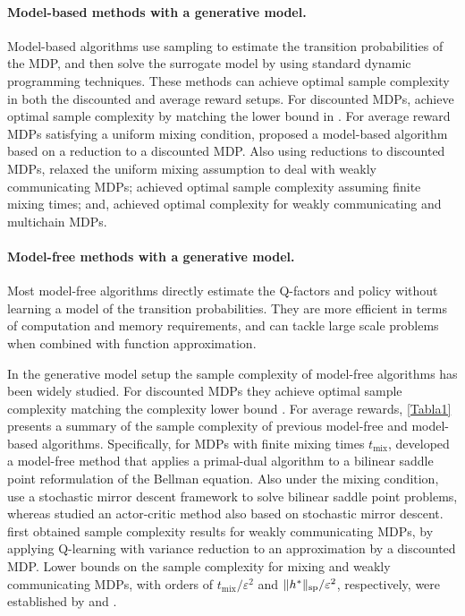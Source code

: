 \documentclass{article}
\renewcommand{\sp}[1]{\|{#1}\|_\text{\rm sp}}
\theoremstyle{plain}
\theoremstyle{definition}
\theoremstyle{remark}
\begin{document}
\paragraph{Model-based methods with a generative model.}
Model-based algorithms use sampling to estimate the transition probabilities of the MDP, and then solve the surrogate model by using standard dynamic programming techniques. These methods can achieve optimal sample complexity in both the discounted and average reward setups. For discounted MDPs, \citet{agarwal2020model, li2020breaking} achieve optimal sample complexity by matching the lower bound in \citet{gheshlaghi2013minimax}. For average reward MDPs satisfying a uniform mixing condition, \citet{jin2021towards} proposed a model-based algorithm based on a reduction to a discounted MDP. Also using reductions to discounted MDPs, \cite{wang2022near}
relaxed the uniform mixing assumption to deal with weakly communicating MDPs; \citet{wang2023optimal} achieved optimal sample complexity assuming finite mixing times; and,  \citet{zurek2024span} achieved optimal complexity for weakly communicating and multichain MDPs.

\paragraph{Model-free methods with a generative model.}
Most model-free algorithms directly estimate the Q-factors and policy without learning a model of the transition probabilities. They are more efficient in terms of  computation and memory requirements, and can tackle large scale problems when combined with function approximation. 

In the generative model setup \citep{kearns1998finite} the sample complexity of model-free algorithms has been widely studied. For  discounted MDPs they achieve  optimal sample complexity matching the complexity lower bound \cite{sidford2018near,wainwright2019variance,jin2024truncated}.
For average rewards, \cref{Tabla1} presents a summary of the sample complexity of previous model-free and model-based algorithms. Specifically, for MDPs with finite mixing times $t_{\text{mix}}$, \citet{wang2017primal}  developed a model-free method that applies a primal-dual algorithm to a bilinear saddle point reformulation of the Bellman equation.  Also under the mixing  condition, \citet{jin2020efficiently} use a stochastic mirror descent framework to solve bilinear saddle point problems, whereas \citet{li2024stochastic} studied an actor-critic method also based on stochastic mirror descent. \citet{zhang2023sharper} first obtained sample complexity results for weakly communicating MDPs, by applying Q-learning with variance reduction to an approximation by a discounted 
MDP. Lower bounds on the sample complexity for mixing and weakly communicating MDPs, with orders of $t_{\text{mix}}/\varepsilon^{2}$ and $\sp{h^*}/\varepsilon^{2}$, respectively, were established  by \citet{jin2021towards} and \citet{wang2022near}.
\end{document}
